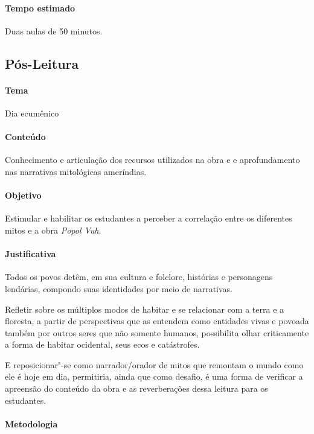 \documentclass[12pt]{extarticle}
\begin{document}
\paragraph{Tempo estimado} Duas aulas de 50 minutos. 

\subsection{Pós-Leitura}

\paragraph{Tema} Dia ecumênico 

\paragraph{Conteúdo} Conhecimento e articulação dos recursos utilizados na obra e 
e aprofundamento nas narrativas mitológicas ameríndias.

\paragraph{Objetivo} Estimular e habilitar os estudantes a perceber a 
correlação entre os diferentes mitos e a obra \emph{Popol Vuh}.

\paragraph{Justificativa} Todos os povos detêm, em sua cultura e folclore,
histórias e personagens lendárias, compondo suas identidades por meio de
narrativas. 

Refletir sobre os múltiplos modos de habitar e se relacionar com a terra e 
a floresta, a partir de perspectivas que as entendem como entidades vivas e povoada 
também por outros seres que não somente humanos, possibilita
olhar criticamente a forma de habitar ocidental, seus ecos e catástrofes.

E reposicionar"-se como narrador/orador de mitos que remontam o mundo como ele é hoje em dia, 
permitiria, ainda que como desafio, é uma forma de 
verificar a apreensão do conteúdo da obra e as reverberações dessa leitura para os estudantes. 

\paragraph{Metodologia} 
\end{document}
